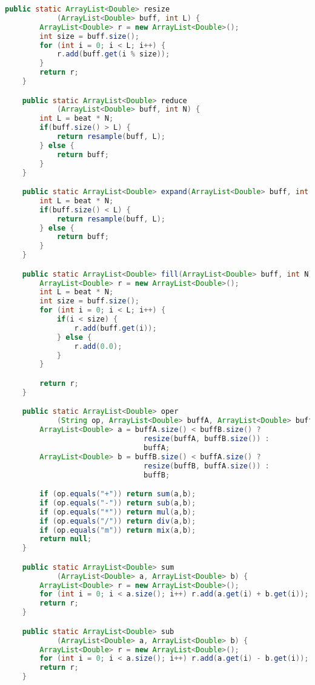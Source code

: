 \documentclass[a4paper]{article}
\begin{document}
\begin{lstlisting}[language=Java]
    public static ArrayList<Double> resize
            (ArrayList<Double> buff, int L) {
        ArrayList<Double> r = new ArrayList<Double>();
        int size = buff.size();
        for (int i = 0; i < L; i++) {
            r.add(buff.get(i % size));
        }
        return r;
    }

    public static ArrayList<Double> reduce
            (ArrayList<Double> buff, int N) {
        int L = beat * N;
        if(buff.size() > L) {
            return resample(buff, L);
        } else {
            return buff;
        }
    }

    public static ArrayList<Double> expand(ArrayList<Double> buff, int N) {
        int L = beat * N;
        if(buff.size() < L) {
            return resample(buff, L);
        } else {
            return buff;
        }
    }

    public static ArrayList<Double> fill(ArrayList<Double> buff, int N) {
        ArrayList<Double> r = new ArrayList<Double>();
        int L = beat * N;
        int size = buff.size();
        for (int i = 0; i < L; i++) {
            if(i < size) {
                r.add(buff.get(i));
            } else {
                r.add(0.0);
            }
        }

        return r;
    }

    public static ArrayList<Double> oper
            (String op, ArrayList<Double> buffA, ArrayList<Double> buffB) {
        ArrayList<Double> a = buffA.size() < buffB.size() ? 
                                resize(buffA, buffB.size()) : 
                                buffA;
        ArrayList<Double> b = buffB.size() < buffA.size() ? 
                                resize(buffB, buffA.size()) : 
                                buffB;

        if (op.equals("+")) return sum(a,b);
        if (op.equals("-")) return sub(a,b);
        if (op.equals("*")) return mul(a,b);
        if (op.equals("/")) return div(a,b);
        if (op.equals("m")) return mix(a,b);
        return null;
    }

    public static ArrayList<Double> sum
            (ArrayList<Double> a, ArrayList<Double> b) {
        ArrayList<Double> r = new ArrayList<Double>();
        for (int i = 0; i < a.size(); i++) r.add(a.get(i) + b.get(i));
        return r;
    }

    public static ArrayList<Double> sub
            (ArrayList<Double> a, ArrayList<Double> b) {
        ArrayList<Double> r = new ArrayList<Double>();
        for (int i = 0; i < a.size(); i++) r.add(a.get(i) - b.get(i));
        return r;
    }


\end{lstlisting}
\end{document}
